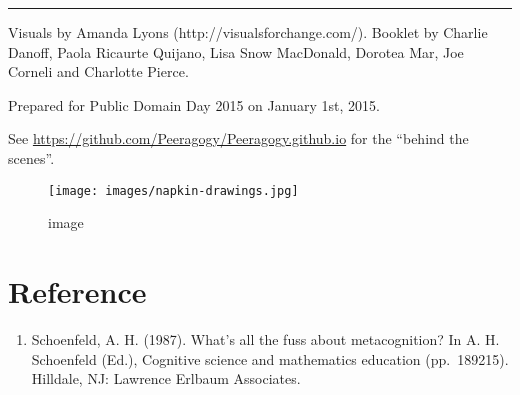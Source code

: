 \begin{center}\rule{0.5\linewidth}{0.5pt}\end{center}

Visuals by Amanda Lyons (http://visualsforchange.com/). Booklet by
Charlie Danoff, Paola Ricaurte Quijano, Lisa Snow MacDonald, Dorotea
Mar, Joe Corneli and Charlotte Pierce.

Prepared for Public Domain Day 2015 on January 1st, 2015.

See \url{https://github.com/Peeragogy/Peeragogy.github.io} for the
``behind the scenes''.

\begin{figure}
\centering
\texttt{[image: images/napkin-drawings.jpg]}
\caption{image}
\end{figure}

\hypertarget{reference}{%
\section{Reference}\label{reference}}

\begin{enumerate}
\def\labelenumi{\arabic{enumi}.}
\tightlist
\item
  Schoenfeld, A. H. (1987). What's all the fuss about metacognition? In
  A. H. Schoenfeld (Ed.), Cognitive science and mathematics education
  (pp.~189­215). Hilldale, NJ: Lawrence Erlbaum Associates.
\end{enumerate}
